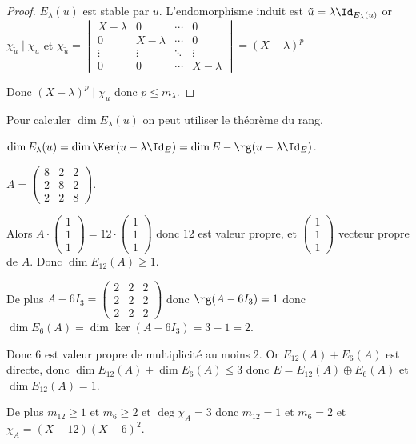 \begin{proof}
    $E_\lambda(u)$ est stable par $u$. L'endomorphisme induit est $\tilde u = \lambda \Id_{E_\lambda(u)}$
    or $\chi_{\tilde u} \mid \chi_u$ et 
    $\chi_{\tilde u} = \begin{vmatrix}
        X - \lambda & 0 & \cdots & 0 \\
        0 & X - \lambda & \cdots & 0 \\
        \vdots & \vdots & \ddots & \vdots \\
        0 & 0 & \cdots & X - \lambda
    \end{vmatrix} = (X - \lambda)^p$

    Donc $(X - \lambda)^p \mid \chi_u$ donc $p \leqslant m_\lambda$.
\end{proof}

\begin{remarque}
    Pour calculer $\dim E_\lambda(u)$ on peut utiliser le théorème du rang. 

    $\dim E_\lambda(u) = \dim \Ker (u - \lambda \Id_E) = \dim E - \rg(u - \lambda \Id_E)$.
\end{remarque}



\begin{exemple}
    $A = \begin{pmatrix}
        8 & 2 & 2 \\
        2 & 8 & 2 \\
        2 & 2 & 8
    \end{pmatrix}$.

    Alors $A \cdot \begin{pmatrix}
        1 \\
        1 \\
        1
    \end{pmatrix} = 12 \cdot \begin{pmatrix}
        1 \\
        1 \\
        1
    \end{pmatrix}$ donc $12$ est valeur propre, et $\begin{pmatrix}
        1 \\
        1 \\
        1
    \end{pmatrix}$ vecteur propre de $A$. Donc $\dim E_{12}(A) \geqslant 1$.

    De plus $A - 6 I_3 = \begin{pmatrix}
        2 & 2 & 2 \\
        2 & 2 & 2 \\
        2 & 2 & 2
    \end{pmatrix}$ donc $\rg(A - 6 I_3) = 1$ donc $\dim E_6(A) = \dim \ker (A - 6 I_3) = 3 - 1 = 2$.

    Donc $6$ est valeur propre de multiplicité au moins $2$. Or $E_{12}(A) + E_6(A)$ est directe, donc 
    $\dim E_{12}(A) + \dim E_6(A) \leqslant 3$ donc $E = E_{12}(A) \oplus E_6(A)$ et $\dim E_{12}(A) = 1$.

    De plus $m_{12} \geqslant 1$ et $m_6 \geqslant 2$ et $\deg \chi_A = 3$ donc $m_{12} = 1$ et $m_6 = 2$
    et $\chi_A = (X - 12)(X - 6)^2$.

\end{exemple}


